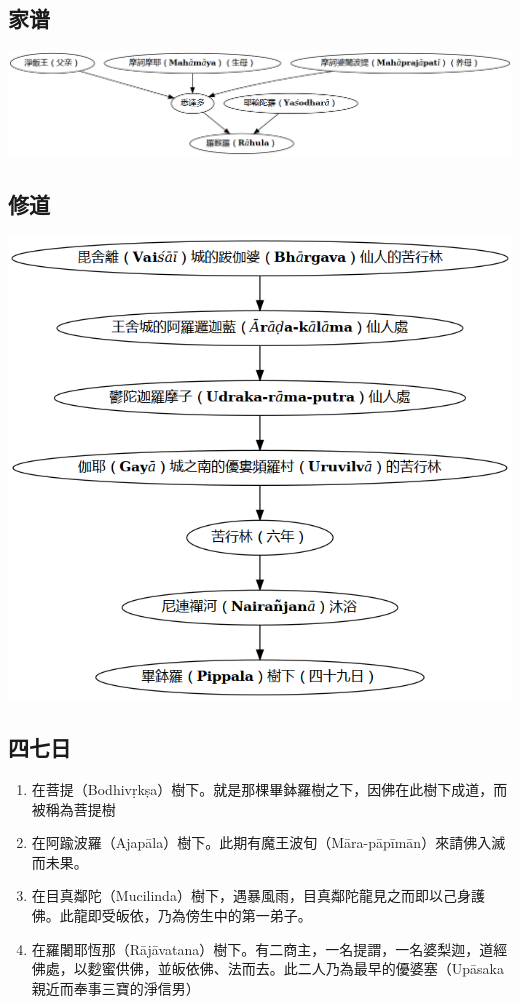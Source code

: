 \subsection{家谱}
\includegraphics[width=\textwidth]{释家/images/释尊家谱.png}

\subsection{修道}
\includegraphics[width=\textwidth]{释家/images/释尊修行地图.png}

\subsection{四七日}
\begin{enumerate}
  \item 在菩提（Bodhivṛkṣa）樹下。就是那棵畢鉢羅樹之下，因佛在此樹下成道，而被稱為菩提樹
  \item 在阿踰波羅（Ajapāla）樹下。此期有魔王波旬（Māra-pāpīmān）來請佛入滅而未果。
  \item 在目真鄰陀（Mucilinda）樹下，遇暴風雨，目真鄰陀龍見之而即以己身護佛。此龍即受皈依，乃為傍生中的第一弟子。
  \item 在羅闍耶恆那（Rājāvatana）樹下。有二商主，一名提謂，一名婆梨迦，道經佛處，以麨蜜供佛，並皈依佛、法而去。此二人乃為最早的優婆塞（Upāsaka 親近而奉事三寶的淨信男）
\end{enumerate}

